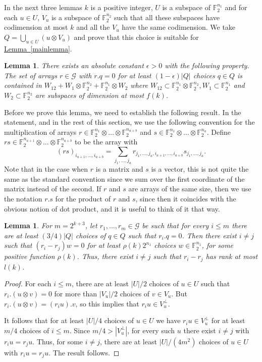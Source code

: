 \documentclass[11pt]{article}
\numberwithin{equation}{section}
\newtheorem{lemma}[theorem]{Lemma}
\theoremstyle{definition}
\theoremstyle{plain}
\newcommand{\expref}[2]{\hyperref[#2]{#1~\ref{#2}}}
\newcommand\eps{\epsilon}  %
\newcommand\F{\mathbb{F}}
\newcommand \cG{\mathcal G}
\newcommand \s{\subset}
\begin{document}
In the next three lemmas $k$ is a positive integer, $U$ is a subspace of $\F_2^{n_1}$ and for each $u\in U$, $V_u$ is a subspace of $\F_2^{n_2}$ such that all these subspaces have codimension at most $k$ and all the $V_u$ have the same codimension. We take $Q=\bigcup_{u\in U} (u\otimes V_u)$ and prove that this choice is suitable for \expref{Lemma}{mainlemma}.

\begin{lemma} \label{Qworks}
	There exists an absolute constant $\eps>0$ with the following property. The set of arrays $r\in \cG$ with $r.q=0$ for at least $(1-\eps)|Q|$ choices $q\in Q$ is contained in $W_{12}+W_1\otimes \F_2^{n_2}+\F_2^{n_1}\otimes W_2$ where $W_{12}\s \F_2^{n_1}\otimes \F_2^{n_2},W_1\s \F_2^{n_1}$ and $W_2\s \F_2^{n_2}$ are subspaces of dimension at most $f(k)$.
\end{lemma}

Before we prove this lemma, we need to establish the following result. In the statement, and in the rest of this section, we use the following convention for the multiplication of arrays $r\in \F_2^{n_1}\otimes \dots \otimes \F_2^{n_{a+b}}$ and $s\in \F_2^{n_1}\otimes \dots \otimes \F_2^{n_{a}}$. Define $rs\in \F_2^{n_{a+1}}\otimes \dots \otimes \F_2^{n_{a+b}}$ to be the array with
\[ (rs)_{i_{a+1},\dots,i_{a+b}}=\sum_{j_1,\dots,j_a}r_{j_1,\dots,j_a,i_{a+1},\dots,i_{a+b}}s_{j_1,\dots,j_a}.
\]
Note that in the case when $r$ is a matrix and $s$ is a vector, this
is not quite the same as the standard convention since we sum over the
first coordinate of the matrix instead of the second. If $r$ and $s$
are arrays of the same size, then we use the notation $r.s$ for the
product of $r$ and $s$, since then it coincides with the obvious
notion of dot product, and it is useful to think of it that way.

\begin{lemma} \label{smallrank}
	For $m=2^{k+3}$, let $r_1,\dots,r_m\in \cG$ be such that for every $i\leq m$ there are 
	at least $(3/4) |Q|$ choices of $q\in Q$ such that $r_i.q=0$. Then there exist $i\neq j$ such that $(r_i-r_j)w=0$ for at least $\rho(k)2^{n_1}$ choices $w\in \F_2^{n_1}$, for some positive function $\rho(k)$. Thus, there exist $i\neq j$ such that $r_i-r_j$ has rank at most $l(k)$.
\end{lemma}


\begin{proof}
  For each $i\leq m$, there are at least $|U|/2$ choices of $u\in U$
  such that $r_i.(u\otimes v)=0$ for more than $|V_u|/2$ choices of
  $v\in V_u$. But $r_i.(u\otimes v)=(r_iu).v$, so this implies that
  $r_iu\in V_u^\perp$.
	
	It follows that for at least $|U|/4$ choices of $u\in U$ we have $r_iu\in V_u^{\perp}$ for at least $m/4$ choices of $i\leq m$. Since $m/4>|V_u^{\perp}|$, for every such $u$ there exist $i\neq j$ with $r_iu=r_ju$. Thus, for some $i\neq j$, there are at least ${|U|}/{(4m^2)}$ choices of $u\in U$ with $r_iu=r_ju$. The result follows.
\end{proof}
\end{document}
